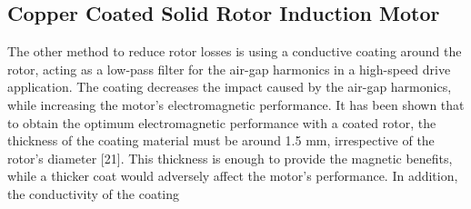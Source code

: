\subsection{Copper Coated Solid Rotor Induction Motor} %

The other method to reduce rotor losses is using a conductive coating around the
rotor, acting as a low-pass filter for the air-gap harmonics in a high-speed drive
application. The coating decreases the impact caused by the air-gap harmonics, while
increasing the motor's electromagnetic performance. It has been shown that to obtain
the optimum electromagnetic performance with a coated rotor, the thickness of the
coating material must be around 1.5 mm, irrespective of the rotor's diameter [21].
This thickness is enough to provide the magnetic benefits, while a thicker coat would
adversely affect the motor's performance. In addition, the conductivity of the coating
